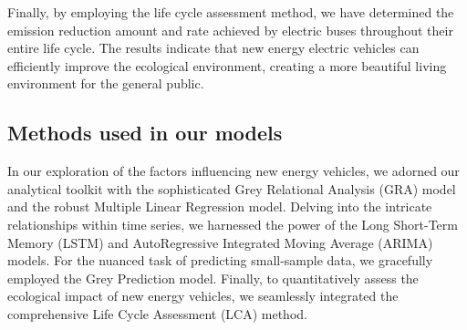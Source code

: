 \documentclass{apmcmthesis}
\begin{document}
Finally, by employing the life cycle assessment method, we have determined the emission reduction amount and rate achieved by electric buses throughout their entire life cycle. The results indicate that new energy electric vehicles can efficiently improve the ecological environment, creating a more beautiful living environment for the general public.

\subsection{Methods used in our models}
In our exploration of the factors influencing new energy vehicles, we adorned our analytical toolkit with the sophisticated Grey Relational Analysis (GRA) model and the robust Multiple Linear Regression model. Delving into the intricate relationships within time series, we harnessed the power of the Long Short-Term Memory (LSTM) and AutoRegressive Integrated Moving Average (ARIMA) models. For the nuanced task of predicting small-sample data, we gracefully employed the Grey Prediction model. Finally, to quantitatively assess the ecological impact of new energy vehicles, we seamlessly integrated the comprehensive Life Cycle Assessment (LCA) method.









\newpage
\end{document}
